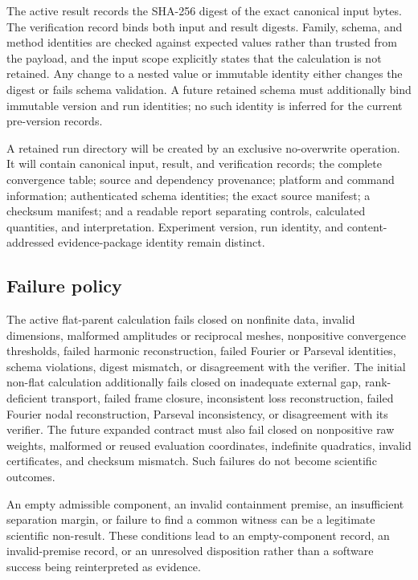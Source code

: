 \documentclass[11pt]{article}
\begin{document}
The active result records the SHA-256 digest of the exact canonical input bytes. The
verification record binds both input and result digests. Family, schema, and method
identities are checked against expected values rather than trusted from the payload, and
the input scope explicitly states that the calculation is not retained. Any change to a
nested value or immutable identity either changes the digest or fails schema validation.
A future retained schema must additionally bind immutable version and run identities;
no such identity is inferred for the current pre-version records.

A retained run directory will be created by an exclusive no-overwrite operation. It will
contain canonical input, result, and verification records; the complete convergence table;
source and dependency provenance; platform and command information; authenticated
schema identities; the exact source manifest; a checksum manifest; and a readable
report separating controls, calculated quantities, and interpretation. Experiment
version, run identity, and content-addressed evidence-package identity remain distinct.

\subsection{Failure policy}

The active flat-parent calculation fails closed on nonfinite data, invalid dimensions,
malformed amplitudes or reciprocal meshes, nonpositive convergence thresholds, failed
harmonic reconstruction, failed Fourier or Parseval identities, schema violations,
digest mismatch, or disagreement with the verifier. The initial non-flat calculation
additionally fails closed on inadequate external gap, rank-deficient transport, failed
frame closure, inconsistent loss reconstruction, failed Fourier nodal reconstruction,
Parseval inconsistency, or disagreement with its verifier. The future expanded contract
must also fail closed on nonpositive raw weights, malformed or reused evaluation
coordinates, indefinite quadratics, invalid certificates, and checksum mismatch. Such
failures do not become scientific outcomes.

An empty admissible component, an invalid containment premise, an insufficient
separation margin, or failure to find a common witness can be a legitimate scientific
non-result. These conditions lead to an empty-component record, an invalid-premise
record, or an unresolved disposition rather than a software success being reinterpreted
as evidence.
\end{document}
